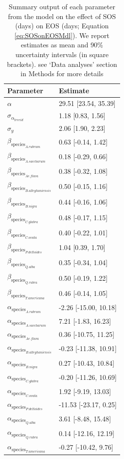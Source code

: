\begin{table}[ht]
\centering
\caption{Summary output of each parameter from the model on the effect of SOS (days) on EOS (days; Equation \ref{eq:SOSonEOSMdl}). We report estimates as mean and 90\% uncertainty intervals (in square brackets). see `Data analyses' section in Methods for more details} 
\label{tab:tab_SOSonEOS}
\begin{tabular}{ll}
  \hline
Parameter & Estimate \\ 
  \hline
$\alpha$ & 29.51 [23.54, 35.39] \\ 
  $\sigma_{\alpha_{treeid}}$ & 1.18 [0.83, 1.56] \\ 
  $\sigma_{y}$ & 2.06 [1.90, 2.23] \\ 
  $\beta_{\text{species}_{A. rubrum}}$ & 0.63 [-0.14, 1.42] \\ 
  $\beta_{\text{species}_{A. saccharum}}$ & 0.18 [-0.29, 0.66] \\ 
  $\beta_{\text{species}_{Ae. flava}}$ & 0.38 [-0.32, 1.08] \\ 
  $\beta_{\text{species}_{B. alleghaniensis}}$ & 0.50 [-0.15, 1.16] \\ 
  $\beta_{\text{species}_{B. nigra}}$ & 0.44 [-0.16, 1.06] \\ 
  $\beta_{\text{species}_{C. glabra}}$ & 0.48 [-0.17, 1.15] \\ 
  $\beta_{\text{species}_{C. ovata}}$ & 0.40 [-0.22, 1.01] \\ 
  $\beta_{\text{species}_{P. deltoides}}$ & 1.04 [0.39, 1.70] \\ 
  $\beta_{\text{species}_{Q. alba}}$ & 0.35 [-0.34, 1.04] \\ 
  $\beta_{\text{species}_{Q. rubra}}$ & 0.50 [-0.19, 1.22] \\ 
  $\beta_{\text{species}_{T. americana}}$ & 0.46 [-0.14, 1.05] \\ 
  $\alpha_{\text{species}_{A. rubrum}}$ & -2.26 [-15.00, 10.18] \\ 
  $\alpha_{\text{species}_{A. saccharum}}$ & 7.21 [-1.83, 16.23] \\ 
  $\alpha_{\text{species}_{Ae. flava}}$ & 0.36 [-10.75, 11.25] \\ 
  $\alpha_{\text{species}_{B. alleghaniensis}}$ & -0.23 [-11.38, 10.91] \\ 
  $\alpha_{\text{species}_{B. nigra}}$ & 0.27 [-10.43, 10.84] \\ 
  $\alpha_{\text{species}_{C. glabra}}$ & -0.20 [-11.26, 10.69] \\ 
  $\alpha_{\text{species}_{C. ovata}}$ & 1.92 [-9.19, 13.03] \\ 
  $\alpha_{\text{species}_{P. deltoides}}$ & -11.53 [-23.17, 0.25] \\ 
  $\alpha_{\text{species}_{Q. alba}}$ & 3.61 [-8.48, 15.48] \\ 
  $\alpha_{\text{species}_{Q. rubra}}$ & 0.14 [-12.16, 12.19] \\ 
  $\alpha_{\text{species}_{T. americana}}$ & -0.27 [-10.42, 9.76] \\ 
   \hline
\end{tabular}
\end{table}



